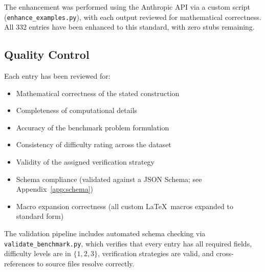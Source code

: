 The enhancement was performed using the Anthropic API via a custom script (\texttt{enhance\_\allowbreak{}examples.py}), with each output reviewed for mathematical correctness.
All 332 entries have been enhanced to this standard, with zero stubs remaining.

\subsection{Quality Control}

Each entry has been reviewed for:
\begin{itemize}[nosep]
  \item Mathematical correctness of the stated construction
  \item Completeness of computational details
  \item Accuracy of the benchmark problem formulation
  \item Consistency of difficulty rating across the dataset
  \item Validity of the assigned verification strategy
  \item Schema compliance (validated against a JSON Schema; see Appendix~\ref{app:schema})
  \item Macro expansion correctness (all custom \LaTeX\ macros expanded to standard form)
\end{itemize}

The validation pipeline includes automated schema checking via \texttt{validate\_benchmark.py}, which verifies that every entry has all required fields, difficulty levels are in $\{1,2,3\}$, verification strategies are valid, and cross-references to source files resolve correctly.

